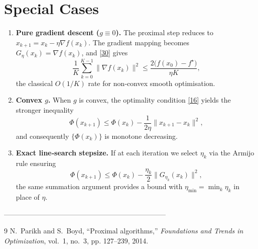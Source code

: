 \documentclass{article}
\begin{document}
\section*{Special Cases}
\begin{enumerate}[label=(\alph*)]
    \item \textbf{Pure gradient descent ($g\equiv0$).}  
    The proximal step reduces to $x_{k+1}=x_k-\eta\nabla f(x_k)$.  
    The gradient mapping becomes $G_{\eta}(x_k)=\nabla f(x_k)$, and \eqref{30} gives
    \[
    \frac{1}{K}\sum_{k=0}^{K-1}\|\nabla f(x_k)\|^{2}\le\frac{2\bigl(f(x_0)-f^\star\bigr)}{\eta K},
    \]
    the classical $O(1/K)$ rate for non‑convex smooth optimisation.

    \item \textbf{Convex $g$.}  
    When $g$ is convex, the optimality condition \eqref{16} yields the stronger inequality
    \[
    \Phi(x_{k+1})\le\Phi(x_k)-\frac{1}{2\eta}\|x_{k+1}-x_k\|^{2},
    \]
    and consequently $\{\Phi(x_k)\}$ is monotone decreasing.

    \item \textbf{Exact line‑search stepsize.}  
    If at each iteration we select $\eta_k$ via the Armijo rule ensuring
    \[
    \Phi(x_{k+1})\le\Phi(x_k)-\frac{\eta_k}{2}\|G_{\eta_k}(x_k)\|^{2},
    \]
    the same summation argument provides a bound with $\eta_{\min}=\min_k\eta_k$ in place of $\eta$.
\end{enumerate}

---------------------------------------------------------------------

\begin{thebibliography}{9}
N.~Parikh and S.~Boyd, ``Proximal algorithms,'' \emph{Foundations and Trends in Optimization}, vol.~1, no.~3, pp. 127–239, 2014.
\end{thebibliography}
\end{document}

